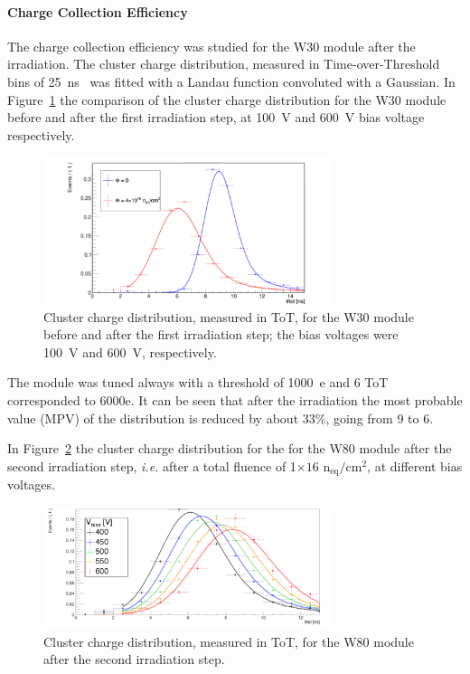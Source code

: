 \paragraph{Charge Collection Efficiency}

The charge collection efficiency was studied for the W30 module after the  irradiation. The cluster charge distribution, measured in Time-over-Threshold bins of 25~ns~\cite{FEI4} was 
fitted with a Landau function convoluted with a Gaussian. In Figure~\ref{fig:IrrCCE} the comparison 
of the cluster charge distribution for the W30 module before and after the first irradiation step, at 100~V and 600~V 
bias voltage respectively.

\begin{figure}[!htpb]
\centering
\includegraphics[width=0.75\textwidth]{CCE_4e15_W30.pdf}
\caption{\label{fig:IrrCCE}Cluster charge distribution, measured in ToT,  for the W30 module before and after the first irradiation 
step; the bias voltages were 100~V and 600~V, respectively.}
\end{figure}

The module was tuned always with a threshold of 1000~e and 6 ToT corresponded to 6000e. 
It can be seen that after the irradiation the most probable value (MPV) of the distribution is reduced 
by about 33\%, going from 9 to 6.

In Figure~\ref{fig:new_mpv_bias} the  cluster charge distribution for the for the W80 module  after the second irradiation 
step, {\it i.e.} after a total fluence of 1$\times{16}$ n$_\text{eq}/\text{cm}^2$, at different bias voltages. 
\begin{figure}[!htpb]
\centering
\includegraphics[width=0.75\textwidth]{new_mpv_bias.pdf}
\caption{\label{fig:new_mpv_bias}Cluster charge distribution, measured in ToT,  for the W80 module  after the second irradiation 
step.}
\end{figure}

